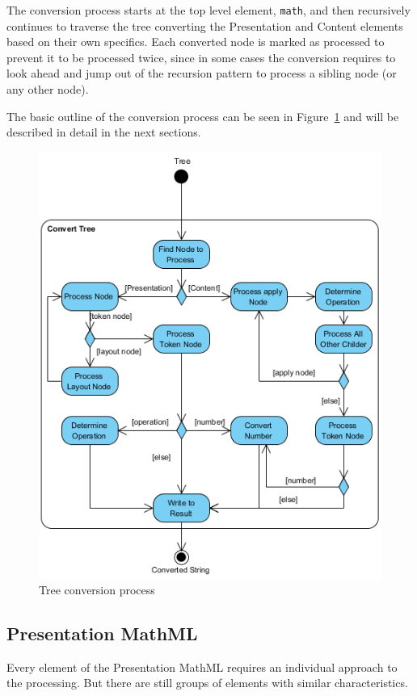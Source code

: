 \documentclass[11pt,oneside,final]{fithesis2}
\begin{document}
The conversion process starts at the top level element, \texttt{math}, and then recursively continues to traverse the tree  converting the Presentation and Content elements based on their own specifics. Each converted node is marked as processed to prevent it to be processed twice, since in some cases the conversion requires to look ahead and jump out of the recursion pattern to process a sibling node (or any other node).

The basic outline of the conversion process can be seen in Figure~\ref{fig:converttree} and will be described in detail in the next sections.

\begin{figure}[!ht]
\centering
\includegraphics{activity_diagram_tree}
\caption{Tree conversion process}
\label{fig:converttree}
\end{figure}

\subsection{Presentation MathML}
Every element of the Presentation MathML requires an individual approach to the processing. But there are still groups of elements with similar characteristics. 
\end{document}
